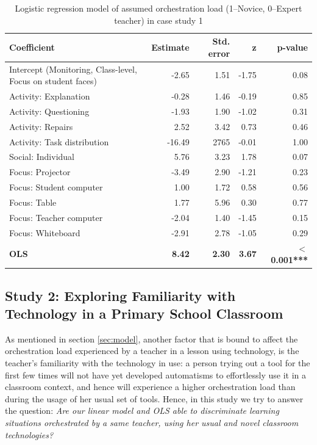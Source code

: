 \documentclass[10pt,journal,compsoc]{IEEEtran}
\begin{document}
\begin{table}[!t]
\caption{Logistic regression model of assumed orchestration load (1--Novice, 0--Expert teacher) in case study 1}
\label{tab:case1results}
\centering
\begin{tabular}{|p{2.8cm}||r|r|r|r|}
\hline
Coefficient & Estimate & Std. error & z & p-value\\
\hline
\hline
Intercept (Monitoring, Class-level, Focus on student faces) & -2.65 & 1.51 & -1.75 & 0.08 \\
Activity: Explanation & -0.28 & 1.46 & -0.19 & 0.85 \\
Activity: Questioning & -1.93 & 1.90 & -1.02 & 0.31 \\
Activity: Repairs & 2.52 & 3.42 & 0.73 & 0.46 \\
Activity: Task distribution & -16.49 & 2765 & -0.01 & 1.00 \\
Social: Individual & 5.76 & 3.23 & 1.78 & 0.07 \\
Focus: Projector & -3.49 & 2.90 & -1.21 & 0.23 \\
Focus: Student computer & 1.00 & 1.72 & 0.58 & 0.56 \\
Focus: Table & 1.77 & 5.96 & 0.30 & 0.77 \\
Focus: Teacher computer & -2.04 & 1.40 & -1.45 & 0.15 \\
Focus: Whiteboard & -2.91 & 2.78 & -1.05 & 0.29 \\
\textbf{OLS} & \textbf{8.42} & \textbf{2.30} & \textbf{3.67} & \textbf{$<$0.001***} \\
\hline
\end{tabular}
\end{table}


\subsection{Study 2: Exploring Familiarity with Technology in a Primary School Classroom}
\label{sec:study2}

As mentioned in section \ref{sec:model}, another factor that is bound to affect the orchestration load experienced by a teacher in a lesson using technology, is the teacher's familiarity with the technology in use: a person trying out a tool for the first few times will not have yet developed automatisms to effortlessly use it in a classroom context, and hence will experience a higher orchestration load than during the usage of her usual set of tools. Hence, in this study we try to answer the question: \textit{Are our linear model and OLS able to discriminate learning situations orchestrated by a same teacher, using her usual and novel classroom technologies?}
\end{document}
